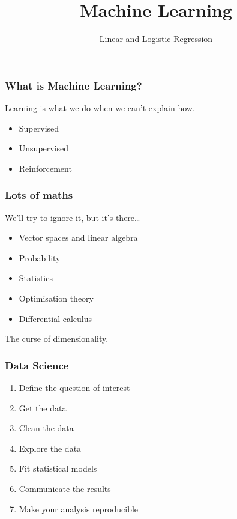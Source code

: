 
\title{Machine Learning}
\subtitle{Linear and Logistic Regression}




\begin{frame}
  \titlepage
\end{frame}


\begin{frame}
\end{frame}

\begin{frame}
  \frametitle{What is Machine Learning?}
  Learning is what we do when we can't explain how.
  \begin{itemize}
  \item Supervised
  \item Unsupervised
  \item Reinforcement
  \end{itemize}
\end{frame}

\begin{frame}
  \frametitle{Lots of maths}
  We'll try to ignore it, but it's there\dots
  \begin{itemize}
  \item Vector spaces and linear algebra
  \item Probability
  \item Statistics
  \item Optimisation theory
  \item Differential calculus
  \end{itemize}
  The curse of dimensionality.
\end{frame}

\begin{frame}
  \frametitle{Data Science}
  \begin{enumerate}
  \item Define the question of interest
  \item Get the data
  \item Clean the data
  \item Explore the data
  \item Fit statistical models
  \item Communicate the results
  \item Make your analysis reproducible
  \end{enumerate}
\end{frame}

